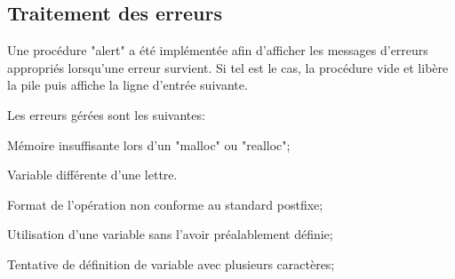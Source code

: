\documentclass[]{report}
\begin{document}
	\begin{normalsize}
		\section*{\LARGE Traitement des erreurs}\vspace{4mm}
		Une procédure "alert" a été implémentée afin d'afficher les messages d'erreurs appropriés lorsqu'une erreur survient. Si tel est le cas, la procédure vide et libère la pile puis affiche la ligne d'entrée suivante.\vspace{4mm}
		\par Les erreurs gérées sont les suivantes:
			\begin{description}[noitemsep]
			\item \hspace{4mm}Mémoire insuffisante lors d'un "malloc" ou "realloc";
			\item \hspace{4mm}Variable différente d'une lettre.
			\item \hspace{4mm}Format de l'opération non conforme au standard postfixe;
			\item \hspace{4mm}Utilisation d'une variable sans l'avoir préalablement définie;
			\item \hspace{4mm}Tentative de définition de variable avec plusieurs caractères;
		\end{description}
		\vspace{4mm}
	\end{normalsize}
\end{document}
